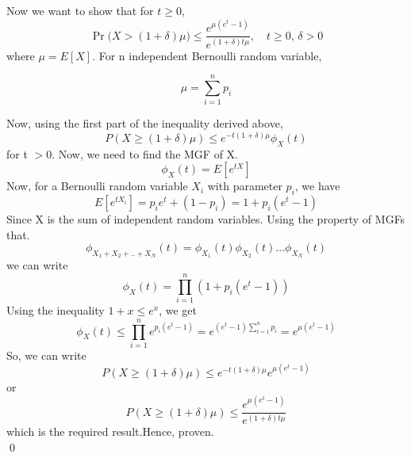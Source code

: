 \documentclass[12pt]{article}
\newenvironment{solution}{%
  \vspace{1em}
  \noindent{\Large\bfseries Solution}\par\vspace{0.5em}
  \normalfont
}{\qed\par}
\begin{document}
\begin{solution}


Now we want to show that for $t \geq 0$,
    \[
\Pr\!\big(X > (1 + \delta)\mu \big) \leq \frac{e^{\mu(e^t - 1)}}{e^{(1+\delta)t\mu}}, 
\quad t \geq 0, \, \delta > 0
\]
where $\mu = E[X]$.
For n independent Bernoulli random variable,
 

\[
\mu = \sum_{i=1}^n p_i
\]

Now, using the first part of the inequality derived above,
\[P(X \geq (1 + \delta)\mu ) \leq e^{-t(1 + \delta)\mu} \phi _X(t)\]
for t $> 0$.
Now, we need to find the MGF of X.
\[\phi _X(t) = E[e^{tX}] \]
Now, for a Bernoulli random variable $X_i$ with parameter $p_i$, we have
\[E[e^{tX_i}] = p_i e^t + (1 - p_i) = 1 + p_i(e^t - 1)\]
Since X is the sum of independent random variables. Using the property of MGFs that.
\[\phi _{X_1+X_2 + .. + X_N}(t) = \phi_{X_1}(t)\phi_{X_2}(t)...\phi_{X_N}(t)\]
we can write
\[\phi _X(t) = \prod_{i=1}^n (1 + p_i(e^t - 1))\]
Using the inequality $1 + x \leq e^x$, we get
\[\phi _X(t) \leq \prod_{i=1}^n e^{p_i(e^t - 1)} = e^{(e^t - 1)\sum_{i=1}^n p_i} = e^{\mu(e^t - 1)}\]
So, we can write
\[P(X \geq (1 + \delta)\mu ) \leq e^{-t(1 + \delta)\mu} e^{\mu(e^t - 1)}\]
or
\[P(X \geq (1 + \delta)\mu ) \leq \frac{e^{\mu(e^t - 1)}}{e^{(1+\delta)t\mu}}\]
which is the required result.Hence, proven.\\

\end{solution}
\end{document}
